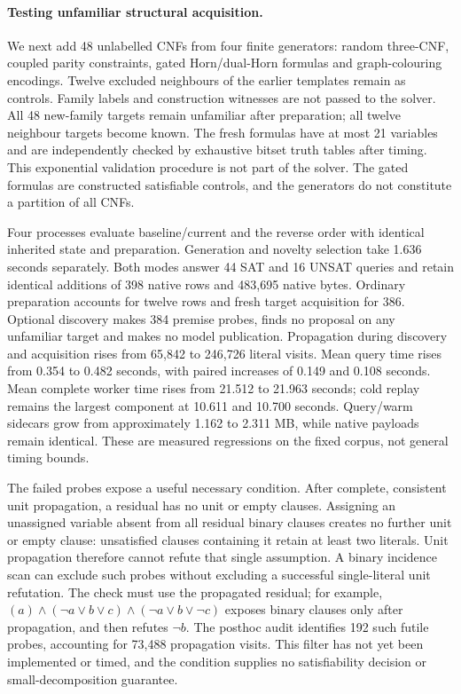 \documentclass[11pt,a4paper]{article}
\numberwithin{equation}{section}
\theoremstyle{plain}
\theoremstyle{definition}
\theoremstyle{remark}
\begin{document}
\paragraph{Testing unfamiliar structural acquisition.}
We next add 48 unlabelled CNFs from four finite generators: random three-CNF,
coupled parity constraints, gated Horn/dual-Horn formulas and graph-colouring
encodings. Twelve excluded neighbours of the earlier templates remain as
controls. Family labels and construction witnesses are not passed to the solver.
All 48 new-family targets remain unfamiliar after preparation; all twelve
neighbour targets become known. The fresh formulas have at most 21 variables
and are independently checked by exhaustive bitset truth tables after timing.
This exponential validation procedure is not part of the solver. The gated
formulas are constructed satisfiable controls, and the generators do not
constitute a partition of all CNFs.

Four processes evaluate baseline/current and the reverse order with identical
inherited state and preparation. Generation and novelty selection take 1.636
seconds separately. Both modes answer 44 SAT and 16 UNSAT queries and retain
identical additions of 398 native rows and 483,695 native bytes. Ordinary
preparation accounts for twelve rows and fresh target acquisition for 386.
Optional discovery makes 384 premise probes, finds no proposal on any unfamiliar
target and makes no model publication. Propagation during discovery and
acquisition rises from 65,842 to 246,726 literal visits. Mean query time rises
from 0.354 to 0.482 seconds, with paired increases of 0.149 and 0.108 seconds.
Mean complete worker time rises from 21.512 to 21.963 seconds; cold replay remains
the largest component at 10.611 and 10.700 seconds. Query/warm sidecars grow from
approximately 1.162 to 2.311 MB, while native payloads remain identical. These
are measured regressions on the fixed corpus, not general timing bounds.

The failed probes expose a useful necessary condition. After complete,
consistent unit propagation, a residual has no unit or empty clauses. Assigning
an unassigned variable absent from all residual binary clauses creates no further unit or
empty clause: unsatisfied clauses containing it retain at least two literals.
Unit propagation therefore cannot refute that single assumption. A binary
incidence scan can exclude such probes without excluding a successful
single-literal unit refutation. The check must use the propagated residual;
for example, $(a)\land(\neg a\lor b\lor c)\land(\neg a\lor b\lor\neg c)$
exposes binary clauses only after propagation, and then refutes $\neg b$.
The posthoc audit identifies 192 such futile probes, accounting for 73,488
propagation visits. This filter has not yet been implemented or timed, and the
condition supplies no satisfiability decision or small-decomposition guarantee.
\end{document}
